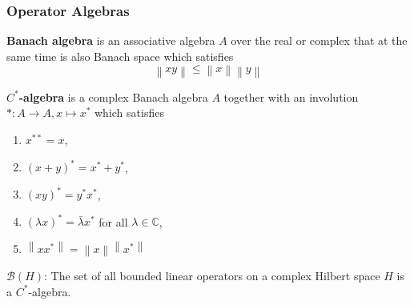 \documentclass{beamer}
\begin{document}
\begin{frame}
    \frametitle{Operator Algebras}
        \textbf{Banach algebra} is an associative algebra \(A\) over the real or complex that at the same time is also Banach space which satisfies
        \[\left \lVert xy \right \rVert \le \left \lVert x \right \rVert \left \lVert y \right \rVert\]\pause
        
        \textbf{\(C^\ast\)-algebra} is a complex Banach algebra \(A\) together with an involution \(\ast:A \to A, x \mapsto x^\ast\) which satisfies\pause
            \begin{enumerate}
                \item \(x^{\ast\ast}=x\),\pause
                \item \((x+y)^\ast=x^\ast+y^\ast\),\pause
                \item \((xy)^\ast = y^\ast x^\ast\),\pause
                \item \((\lambda x)^\ast=\bar{\lambda}x^\ast\) for all \(\lambda \in \mathbb{C}\),\pause
                \item \(\left \lVert xx^\ast \right \rVert = \left \lVert x \right \rVert \left \lVert x^\ast \right \rVert \)
            \end{enumerate}\pause
        \begin{example}
            \(\mathcal{B}(H)\): The set of all bounded linear operators on a complex Hilbert space \(H\) is a \(C^\ast\)-algebra.
        \end{example}
    \end{frame}
\end{document}
